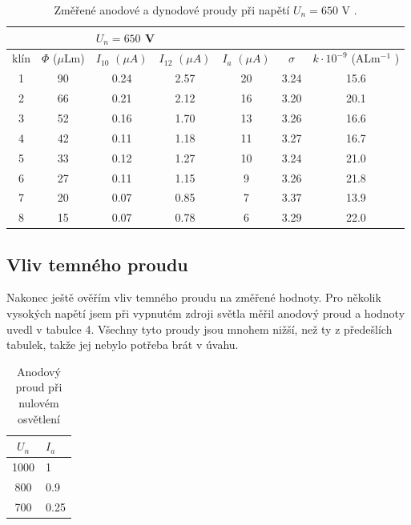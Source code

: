 \documentclass[a4paper,11pt]{article}
\begin{document}
\begin{table}[htpb]
    \centering
    \begin{tabular}{| c c | c c c c c |}
        \hline
        \multicolumn{2}{|l|}{} & \multicolumn{5}{l|}{$ U_n = 650 $ V} \\\hline
        klín & $ \Phi $ ($ \mu $Lm) & $ I_{10} $ $ (\mu A) $  & $ I_{12} $ $ (\mu A) $ & $ I_a $ $ (\mu A) $ & $ \sigma $ & $ k \cdot 10^{-9} $ (ALm$^{-1}  $ ) \\ \hline
        1 & 90 & 0.24 & 2.57 & 20 & 3.24 & 15.6 \\
        2 & 66 & 0.21 & 2.12 & 16 & 3.20 & 20.1 \\
        3 & 52 & 0.16 & 1.70 & 13 & 3.26 & 16.6 \\
        4 & 42 & 0.11 & 1.18 & 11 & 3.27 & 16.7 \\
        5 & 33 & 0.12 & 1.27 & 10 & 3.24 & 21.0 \\
        6 & 27 & 0.11 & 1.15 & 9  & 3.26 & 21.8 \\
        7 & 20 & 0.07 & 0.85 & 7  & 3.37 & 13.9 \\
        8 & 15 & 0.07 & 0.78 & 6  & 3.29 & 22.0 \\
        \hline
    \end{tabular}
    \caption{Změřené anodové a dynodové proudy při napětí $ U_n = 650 $ V .}
\end{table}

\subsection{Vliv temného proudu}

Nakonec ještě ověřím vliv temného proudu na změřené hodnoty. Pro několik vysokých napětí jsem při vypnutém zdroji světla měřil anodový proud a hodnoty uvedl v tabulce 4. Všechny tyto proudy jsou mnohem nižší, než ty z předešlích tabulek, takže jej nebylo potřeba brát v úvahu.

\begin{table}[htpb]
    \centering
    \begin{tabular}{c l}
        $ U_n $  & $ I_a $  \\\hline
        1000 & 1 \\
        800  & 0.9 \\
        700  & 0.25 \\
    \end{tabular} 
    \caption{Anodový proud při nulovém osvětlení}
\end{table}
\end{document}
